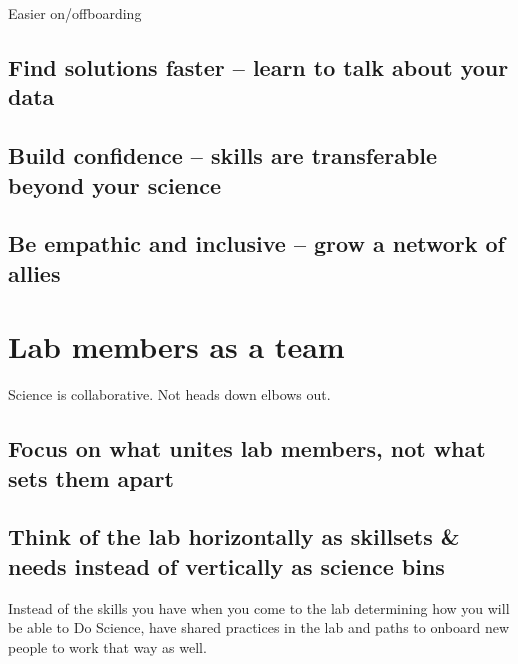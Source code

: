 \documentclass[
  letterpaper,
  DIV=11,
  numbers=noendperiod]{scrreprt}
\begin{document}
Easier on/offboarding

\hypertarget{find-solutions-faster-learn-to-talk-about-your-data}{%
\subsection{Find solutions faster -- learn to talk about your
data}\label{find-solutions-faster-learn-to-talk-about-your-data}}

\hypertarget{build-confidence-skills-are-transferable-beyond-your-science}{%
\subsection{Build confidence -- skills are transferable beyond your
science}\label{build-confidence-skills-are-transferable-beyond-your-science}}

\hypertarget{be-empathic-and-inclusive-grow-a-network-of-allies}{%
\subsection{Be empathic and inclusive -- grow a network of
allies}\label{be-empathic-and-inclusive-grow-a-network-of-allies}}

\hypertarget{lab-members-as-a-team}{%
\section{Lab members as a team}\label{lab-members-as-a-team}}

Science is collaborative. Not heads down elbows out.

\hypertarget{focus-on-what-unites-lab-members-not-what-sets-them-apart}{%
\subsection{Focus on what unites lab members, not what sets them
apart}\label{focus-on-what-unites-lab-members-not-what-sets-them-apart}}

\hypertarget{think-of-the-lab-horizontally-as-skillsets-needs-instead-of-vertically-as-science-bins}{%
\subsection{Think of the lab horizontally as skillsets \& needs instead
of vertically as science
bins}\label{think-of-the-lab-horizontally-as-skillsets-needs-instead-of-vertically-as-science-bins}}

Instead of the skills you have when you come to the lab determining how
you will be able to Do Science, have shared practices in the lab and
paths to onboard new people to work that way as well.
\end{document}
